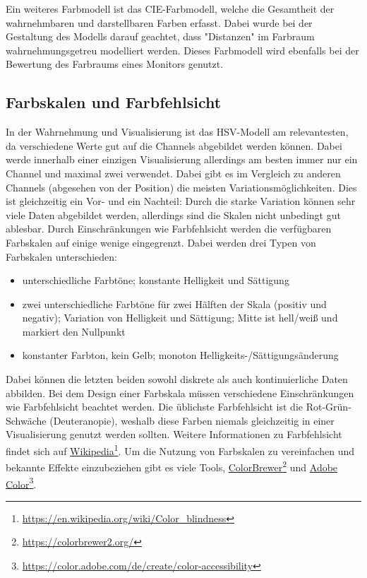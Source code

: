 			Ein weiteres Farbmodell ist das CIE-Farbmodell, welche die Gesamtheit der wahrnehmbaren und darstellbaren Farben erfasst. Dabei wurde bei der Gestaltung des Modells darauf geachtet, dass "Distanzen" im Farbraum wahrnehmungsgetreu modelliert werden. Dieses Farbmodell wird ebenfalls bei der Bewertung des Farbraums eines Monitors genutzt.

		\subsection{Farbskalen und Farbfehlsicht}
			In der Wahrnehmung und Visualisierung ist das HSV-Modell am relevantesten, da verschiedene Werte gut auf die Channels abgebildet werden können. Dabei werde innerhalb einer einzigen Visualisierung allerdings am besten immer nur ein Channel und maximal zwei verwendet. Dabei gibt es im Vergleich zu anderen Channels (abgesehen von der Position) die meisten Variationsmöglichkeiten. Dies ist gleichzeitig ein Vor- und ein Nachteil: Durch die starke Variation können sehr viele Daten abgebildet werden, allerdings sind die Skalen nicht unbedingt gut ablesbar. Durch Einschränkungen wie Farbfehlsicht werden die verfügbaren Farbskalen auf einige wenige eingegrenzt. Dabei werden drei Typen von Farbskalen unterschieden:
			\begin{itemize}
				\item {} unterschiedliche Farbtöne; konstante Helligkeit und Sättigung
				\item {}   zwei unterschiedliche Farbtöne für zwei Hälften der Skala (\bspw positiv und negativ); Variation von Helligkeit und Sättigung; Mitte ist hell/weiß und markiert den Nullpunkt
				\item {} konstanter Farbton, kein Gelb; monoton Helligkeits-/Sättigungsänderung
			\end{itemize}
			Dabei können die letzten beiden sowohl diskrete als auch kontinuierliche Daten abbilden. Bei dem Design einer Farbskala müssen verschiedene Einschränkungen wie Farbfehlsicht beachtet werden. Die üblichste Farbfehlsicht ist die Rot-Grün-Schwäche (Deuteranopie), weshalb diese Farben niemals gleichzeitig in einer Visualisierung genutzt werden sollten. Weitere Informationen zu Farbfehlsicht findet sich auf \href{https://en.wikipedia.org/wiki/Color_blindness}{Wikipedia}\footnote{\url{https://en.wikipedia.org/wiki/Color_blindness}}. Um die Nutzung von Farbskalen zu vereinfachen und bekannte Effekte einzubeziehen gibt es viele Tools, \bspw \href{https://colorbrewer2.org}{ColorBrewer}\footnote{\url{https://colorbrewer2.org/}} und \href{https://color.adobe.com/de/create/color-accessibility}{Adobe Color}\footnote{\url{https://color.adobe.com/de/create/color-accessibility}}.

